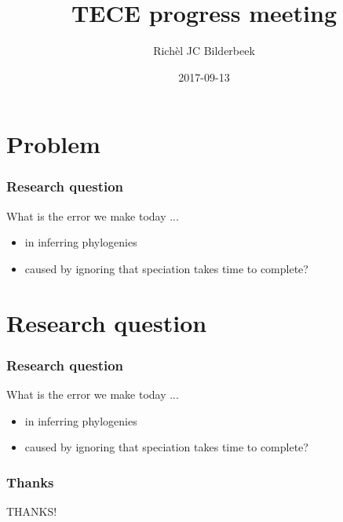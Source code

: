 \documentclass{beamer}
\title[TECE progress meeting]{TECE progress meeting}
\author[RJC Bilderbeek]{Rich\`{e}l JC Bilderbeek}
\institute[University of Groningen]{University of Groningen}
\date[2017-09-13]{2017-09-13}
\begin{document}
\frame{\titlepage}

\section[Problem]{Problem}

\begin{frame}
  \frametitle{Research question}

  What is the error we make today ...

  \begin{itemize}
    \item in inferring phylogenies
    \item caused by ignoring that speciation takes time to complete?
  \end{itemize}

\end{frame}

\section[Research question]{Research question}

\begin{frame}
  \frametitle{Research question}

  What is the error we make today ...

  \begin{itemize}
    \item in inferring phylogenies
    \item caused by ignoring that speciation takes time to complete?
  \end{itemize}

\end{frame}

\begin{frame}
  \frametitle{Thanks}
  
  \center
  \Huge
  \faSmileO THANKS! \faSmileO

\end{frame}
\end{document}
